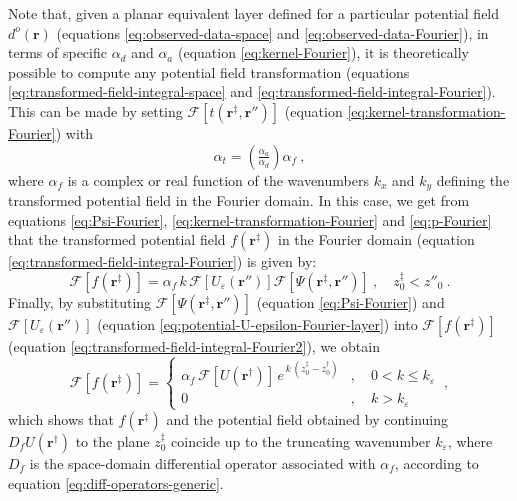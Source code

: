 Note that, given a planar equivalent layer defined for a particular potential field $d^{o}(\mathbf{r})$ 
(equations \ref{eq:observed-data-space} and \ref{eq:observed-data-Fourier}), in terms of specific 
$\alpha_{d}$ and $\alpha_{a}$ (equation \ref{eq:kernel-Fourier}), it is theoretically possible to compute any potential field
transformation (equations \ref{eq:transformed-field-integral-space} and \ref{eq:transformed-field-integral-Fourier}).
This can be made by setting $\mathcal{F} [ t(\mathbf{r}^{\ddagger}, \mathbf{r}'') ]$ (equation \ref{eq:kernel-transformation-Fourier})
with
\begin{equation}
	\alpha_{t} = \left( \tfrac{\alpha_{a}}{\alpha_{d}} \right) \alpha_{f} \: ,
	\label{eq:alpha-t-generic}
\end{equation}
where $\alpha_{f}$ is a complex or real function of the wavenumbers
$k_{x}$ and $k_{y}$ defining the transformed potential field in the Fourier domain.
In this case, we get from equations \ref{eq:Psi-Fourier}, \ref{eq:kernel-transformation-Fourier} and \ref{eq:p-Fourier} 
that the transformed potential field $f(\mathbf{r}^{\ddagger})$ in the Fourier domain (equation \ref{eq:transformed-field-integral-Fourier}) 
is given by:
\begin{equation}
	\mathcal{F} [ f(\mathbf{r}^{\ddagger}) ] =
	\alpha_{f} \, k \, \mathcal{F} \left[ U_{\varepsilon}(\mathbf{r}'') \right]
	\mathcal{F} [ \Psi(\mathbf{r}^{\ddagger}, \mathbf{r}'') ] \: , 
	\quad z^{\ddagger}_{0} < z''_{0} \: .
	\label{eq:transformed-field-integral-Fourier2}
\end{equation}
Finally, by substituting 
$\mathcal{F} \left[ \Psi(\mathbf{r}^{\ddagger}, \mathbf{r}'') \right]$
(equation \ref{eq:Psi-Fourier}) and 
$\mathcal{F} \left[ U_{\varepsilon}(\mathbf{r}'') \right]$
(equation \ref{eq:potential-U-epsilon-Fourier-layer}) into 
$\mathcal{F} [ f(\mathbf{r}^{\ddagger}) ]$ (equation \ref{eq:transformed-field-integral-Fourier2}), we obtain 
\begin{equation}
	\mathcal{F} [ f(\mathbf{r}^{\ddagger}) ] = 
	\begin{cases}
		\alpha_{f} \, \mathcal{F} [ U(\mathbf{r}^{\dagger}) ] \, 
		e^{\, k \, (z^{\ddagger}_{0} - z^{\dagger}_{0})} &
		, \quad 0 < k \le k_{\varepsilon} \\
		0 & , \quad k > k_{\varepsilon} 
	\end{cases} \: ,
	\label{eq:transformed-field-integral-Fourier3}
\end{equation}
which shows that $f(\mathbf{r}^{\ddagger})$ and the potential field obtained by continuing 
$D_{f} U(\mathbf{r}^{\dagger})$ to the plane $z^{\ddagger}_{0}$ coincide up 
to the truncating wavenumber $k_{\varepsilon}$, where $D_{f}$ is the space-domain differential 
operator associated with $\alpha_{f}$, according to equation \ref{eq:diff-operators-generic}.

